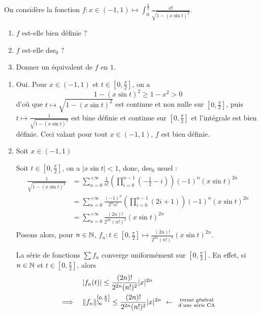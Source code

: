 \begin{exo}
	\label{seriesent1}
	On considère la fonction $f:x\in(-1,1)\mapsto \int_0^{\frac\pi2}\frac{\dd t}{\sqrt{1-(x\sin t)^2}}$.
	\begin{enumerate}
		\item $f$ est-elle bien définie ?
		\item $f$ est-elle dse${}_0$ ?
		\item Donner un équivalent de $f$ en $1$.
	\end{enumerate}
\end{exo}

\begin{solution}
	\begin{enumerate}
		\item Oui. Pour $x\in(-1,1)$ et $t\in\left[0,\frac\pi2\right]$, on a \[1-(x\sin t)^2\geq 1-x^2> 0\]
		d'où que $t\mapsto \sqrt{1-(x\sin t)^2}$ est continue et non nulle sur $\left[0,\frac\pi2\right]$, puis $t\mapsto \frac1{\sqrt{1-(x\sin t)^2}}$ est bine définie et continue sur $\left[0,\frac\pi2\right]$ et l'intégrale est bien définie. Ceci valant pour tout $x\in(-1,1)$, $f$ est bien définie.
		\item Soit $x\in(-1,1)$


		Soit $t\in\left[0,\frac\pi2\right]$, on a $|x\sin t| < 1$, donc, dse${}_0$ usuel : 
		\begin{align*}
			\frac1{\sqrt{1-(x\sin t)^2}} &= \sum_{n=0}^{+\infty}\frac1{n!}\left(\prod_{i=0}^{n-1}\left(-\frac12-i\right)\right)(-1)^n(x\sin t)^{2n}\\
										 &= \sum_{n=0}^{+\infty}\frac{(-1)^n}{2^nn!}\left(\prod_{i=0}^{n-1}(2i+1)\right)(-1)^n(x\sin t)^{2n}\\
										 &= \sum_{n=0}^{+\infty}\frac{(2n)!}{2^{2n}(n!)^2}(x\sin t)^{2n}\\
		\end{align*}
		Posons alors, pour $n\in\operatorname{\mathbb N}$, $f_n:t\in\left[0,\frac\pi2\right]\mapsto\frac{(2n)!}{2^{2n}(n!)^2}(x\sin t)^{2n}$.


		La série de fonctions $\displaystyle\sum f_n$ converge uniformément sur $\left[0,\frac\pi2\right]$. En effet, si $n\in\operatorname{\mathbb N}$ et $t\in\left[0,\frac\pi2\right]$, alors 
		\begin{align*}
			& \quad |f_n(t)|\leq \frac{(2n)!}{2^{2n}(n!)^2}|x|^{2n}\\
			\implies & \quad  \norm{f_n}_\infty^{\left[0,\frac\pi2\right]} \leq \frac{(2n)!}{2^{2n}(n!)^2}|x|^{2n} \ \leftarrow \ \begin{smallmatrix}\text{terme général}\\ \text{d'une série CA}\end{smallmatrix}
		\end{align*}


\end{enumerate}
\end{solution}
